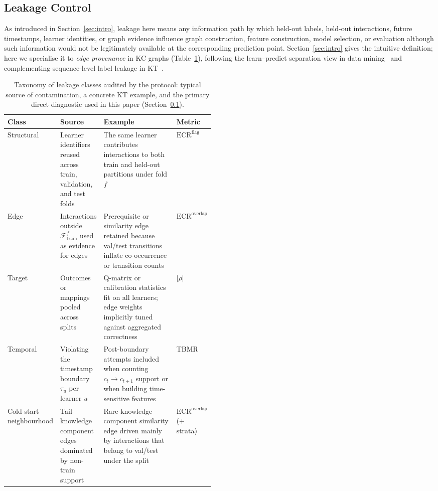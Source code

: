 \documentclass[pdflatex,sn-mathphys-num]{sn-jnl}
\newcommand{\KC}{knowledge component}
\begin{document}
\subsection{Leakage Control}
\label{sec:leakage}
As introduced in Section~\ref{sec:intro}, leakage here means any
information path by which held-out labels, held-out interactions, future
timestamps, learner identities, or graph evidence influence graph
construction, feature construction, model selection, or evaluation although
such information would not be legitimately available at the corresponding
prediction point. Section~\ref{sec:intro} gives the intuitive definition;
here we specialise it to \emph{edge provenance} in KC graphs
(Table~\ref{tab:leakage-taxonomy}), following the learn--predict separation
view in data mining~\cite{kaufman2012leakage,kapoor2023leakage} and
complementing sequence-level label leakage in KT~\cite{liu2022pykt,badran2024labelleakage}.

\begin{table}[t]
\centering
\caption{Taxonomy of leakage classes audited by the protocol: typical
source of contamination, a concrete KT example, and the primary
direct diagnostic used in this paper (Section~\ref{sec:leakage}).}
\label{tab:leakage-taxonomy}
\footnotesize
\setlength{\tabcolsep}{3pt}
\begin{tabularx}{\linewidth}{@{} >{\RaggedRight\arraybackslash}p{0.14\linewidth} >{\RaggedRight\arraybackslash}p{0.18\linewidth} >{\RaggedRight\arraybackslash}X >{\RaggedRight\arraybackslash}p{0.16\linewidth} @{}}
\toprule
Class & Source & Example & Metric \\
\midrule
Structural &
Learner identifiers reused across train, validation, and test folds &
The same learner contributes interactions to both train and held-out partitions under fold $f$ &
$\mathrm{ECR}^{\mathrm{flag}}$ \\
Edge &
Interactions outside $\mathcal{F}_{\text{train}}^f$ used as evidence for edges &
Prerequisite or similarity edge retained because val/test transitions inflate co-occurrence or transition counts &
$\mathrm{ECR}^{\mathrm{overlap}}$ \\
Target &
Outcomes or mappings pooled across splits &
Q-matrix or calibration statistics fit on all learners; edge weights implicitly tuned against aggregated correctness &
$|\rho|$ \\
Temporal &
Violating the timestamp boundary $\tau_u$ per learner $u$ &
Post-boundary attempts included when counting $c_t\!\to\!c_{t+1}$ support or when building time-sensitive features &
TBMR \\
Cold-start neighbourhood &
Tail-\KC{} edges dominated by non-train support &
Rare-\KC{} similarity edge driven mainly by interactions that belong to val/test under the split &
$\mathrm{ECR}^{\mathrm{overlap}}$ (+ strata) \\
\bottomrule
\end{tabularx}
\end{table}
\end{document}
